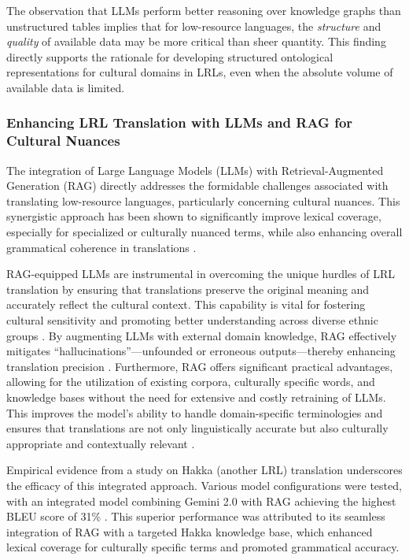 \documentclass[12pt]{article}
\let\cite\textcite  %
\begin{document}
The observation that LLMs perform better reasoning over knowledge graphs than unstructured tables implies that for low-resource languages, the \emph{structure} and \emph{quality} of available data may be more critical than sheer quantity. This finding directly supports the rationale for developing structured ontological representations for cultural domains in LRLs, even when the absolute volume of available data is limited.

\subsubsection{Enhancing LRL Translation with LLMs and RAG for Cultural Nuances}

The integration of Large Language Models (LLMs) with Retrieval-Augmented Generation (RAG) directly addresses the formidable challenges associated with translating low-resource languages, particularly concerning cultural nuances. This synergistic approach has been shown to significantly improve lexical coverage, especially for specialized or culturally nuanced terms, while also enhancing overall grammatical coherence in translations \cite{li2024rag}.

RAG-equipped LLMs are instrumental in overcoming the unique hurdles of LRL translation by ensuring that translations preserve the original meaning and accurately reflect the cultural context. This capability is vital for fostering cultural sensitivity and promoting better understanding across diverse ethnic groups \cite{li2024rag}. By augmenting LLMs with external domain knowledge, RAG effectively mitigates ``hallucinations''—unfounded or erroneous outputs—thereby enhancing translation precision \cite{li2024rag}. Furthermore, RAG offers significant practical advantages, allowing for the utilization of existing corpora, culturally specific words, and knowledge bases without the need for extensive and costly retraining of LLMs. This improves the model's ability to handle domain-specific terminologies and ensures that translations are not only linguistically accurate but also culturally appropriate and contextually relevant \cite{li2024rag}.

Empirical evidence from a study on Hakka (another LRL) translation underscores the efficacy of this integrated approach. Various model configurations were tested, with an integrated model combining Gemini 2.0 with RAG achieving the highest BLEU score of 31\% \cite{li2024rag}. This superior performance was attributed to its seamless integration of RAG with a targeted Hakka knowledge base, which enhanced lexical coverage for culturally specific terms and promoted grammatical accuracy.
\end{document}
